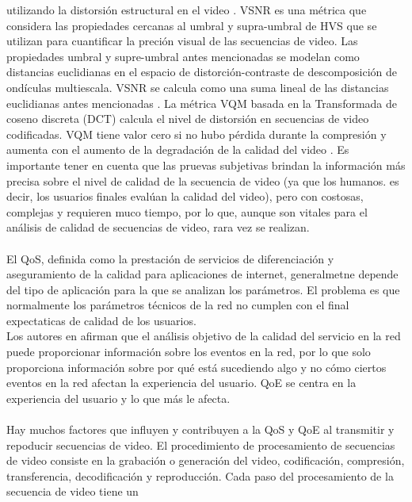 \documentclass[conference]{IEEEtran}
\begin{document}
    utilizando la distorsión estructural en el video \cite{biblio7}. VSNR es una métrica que 
    considera las propiedades cercanas al umbral y supra-umbral de HVS que se 
    utilizan para cuantificar la preción visual de las secuencias de video. Las 
    propiedades umbral y supre-umbral antes mencionadas se modelan como 
    distancias euclidianas en el espacio de distorción-contraste de descomposición de 
    ondículas multiescala. VSNR se calcula como una suma lineal de las distancias 
    euclidianas antes mencionadas \cite{biblio9}. La métrica VQM basada en la Transformada de 
    coseno discreta (DCT) calcula el nivel de distorsión en secuencias de video 
    codificadas. VQM tiene valor cero si no hubo pérdida durante la compresión y 
    aumenta con el aumento de la degradación de la calidad del video \cite{biblio7}. Es importante 
    tener en cuenta que las pruevas subjetivas brindan la información más precisa sobre 
    el nivel de calidad de la secuencia de video (ya que los humanos. es decir, los 
    usuarios finales evalúan la calidad del video), pero con costosas, complejas y 
    requieren muco tiempo, por lo que, aunque son vitales para el análisis de calidad 
    de secuencias de video, rara vez se realizan.\\
    \\
    El QoS, definida como la prestación de servicios de diferenciación y 
    aseguramiento de la calidad para aplicaciones de internet, generalmetne depende del 
    tipo de aplicación para la que se analizan los parámetros. El problema es que 
    normalmente los parámetros técnicos de la red no cumplen con el final expectaticas de 
    calidad de los usuarios.\\
    Los autores en \cite{biblio10}afirman que el análisis objetivo de la calidad del servicio en la red 
    puede proporcionar información sobre los eventos en la red, por lo que solo 
    proporciona información sobre por qué está sucediendo algo y no cómo ciertos 
    eventos en la red afectan la experiencia del usuario. QoE se centra en la experiencia 
    del usuario y lo que más le afecta.\\
    \\
    Hay muchos factores que influyen y contribuyen a la QoS y QoE al 
    transmitir y repoducir secuencias de video. El procedimiento de 
    procesamiento de secuencias de video consiste en la grabación o generación 
    del video, codificación, compresión, transferencia, decodificación y 
    reproducción. Cada paso del procesamiento de la secuencia de video tiene un 
\end{document}
